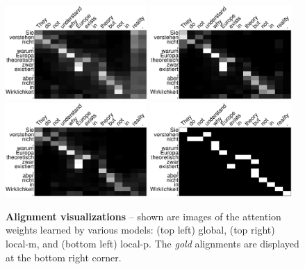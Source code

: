 \begin{figure}
  \begin{center}
    \includegraphics[width=0.48\textwidth]{img/4-align4.eps}
    \includegraphics[width=0.48\textwidth]{img/4-align2.eps}
    \includegraphics[width=0.48\textwidth]{img/4-align1.eps}
    \includegraphics[width=0.48\textwidth]{img/4-alignGold.eps}
  \end{center}
  \caption[Alignment visualizations]{{\bf Alignment visualizations} -- shown are images of the attention
  weights learned by various models: (top left) global, (top right)
  local-m, and (bottom left) local-p. The {\it gold} alignments are
  displayed at the bottom right corner.
  }
  \label{i:alignment}
\end{figure}

